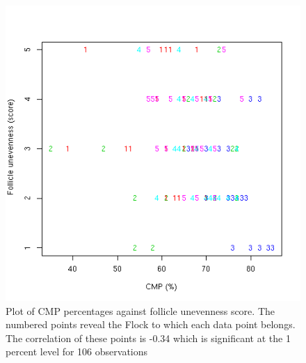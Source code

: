 %

\begin{figure}[!h]
  \centering
  \includegraphics[width=1.0\textwidth]{CMPFu.png}
  \caption{Plot of CMP percentages against follicle unevenness score. The numbered points reveal the Flock to which each data point belongs. The correlation of these points is -0.34 which is significant at the 1 percent level for 106 observations}
  \label{fig:CMPFu}
\end{figure}

%

